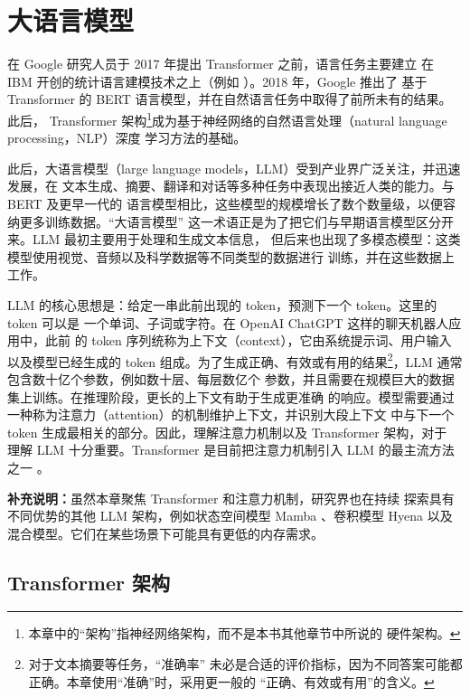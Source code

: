 \chapter{大语言模型}
\label{chap:large-language-models}
\chaptercontents

\setcounter{footnote}{0}

在 Google 研究人员于 2017 年提出 Transformer \cite{ch20-1} 之前，语言任务主要建立
在 IBM 开创的统计语言建模技术之上（例如 \cite{ch20-2}）。2018 年，Google 推出了
基于 Transformer 的 BERT 语言模型，并在自然语言任务中取得了前所未有的结果。此后，
Transformer 架构\footnote{本章中的“架构”指神经网络架构，而不是本书其他章节中所说的
硬件架构。}成为基于神经网络的自然语言处理（natural language processing，NLP）深度
学习方法的基础。

此后，大语言模型（large language models，LLM）受到产业界广泛关注，并迅速发展，在
文本生成、摘要、翻译和对话等多种任务中表现出接近人类的能力。与 BERT 及更早一代的
语言模型相比，这些模型的规模增长了数个数量级，以便容纳更多训练数据。“大语言模型”
这一术语正是为了把它们与早期语言模型区分开来。LLM 最初主要用于处理和生成文本信息，
但后来也出现了多模态模型：这类模型使用视觉、音频以及科学数据等不同类型的数据进行
训练，并在这些数据上工作。

LLM 的核心思想是：给定一串此前出现的 token，预测下一个 token。这里的 token 可以是
一个单词、子词或字符。在 OpenAI ChatGPT \cite{ch20-3} 这样的聊天机器人应用中，此前
的 token 序列统称为上下文（context），它由系统提示词、用户输入以及模型已经生成的
token 组成。为了生成正确、有效或有用的结果\footnote{对于文本摘要等任务，“准确率”
未必是合适的评价指标，因为不同答案可能都正确。本章使用“准确”时，采用更一般的
“正确、有效或有用”的含义。}，LLM 通常包含数十亿个参数，例如数十层、每层数亿个
参数，并且需要在规模巨大的数据集上训练。在推理阶段，更长的上下文有助于生成更准确
的响应。模型需要通过一种称为注意力（attention）的机制维护上下文，并识别大段上下文
中与下一个 token 生成最相关的部分。因此，理解注意力机制以及 Transformer 架构，对于
理解 LLM 十分重要。Transformer 是目前把注意力机制引入 LLM 的最主流方法之一
\cite{ch20-1}。

\noindent\textbf{补充说明：}虽然本章聚焦 Transformer 和注意力机制，研究界也在持续
探索具有不同优势的其他 LLM 架构，例如状态空间模型 Mamba \cite{ch20-4}、卷积模型
Hyena \cite{ch20-5} 以及混合模型。它们在某些场景下可能具有更低的内存需求。

\section{Transformer 架构}
\label{sec:ch20-transformer}

